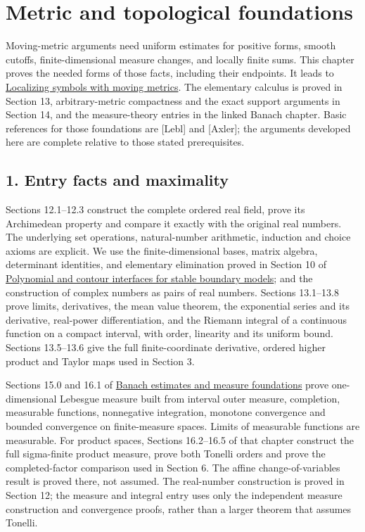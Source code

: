 \documentclass[
  11pt,
]{article}
\author{}
\date{}
\begin{document}
\section{Metric and topological
foundations}\label{metric-and-topological-foundations}

Moving-metric arguments need uniform estimates for positive forms,
smooth cutoffs, finite-dimensional measure changes, and locally finite
sums. This chapter proves the needed forms of those facts, including
their endpoints. It leads to \href{metric-localization.pdf}{Localizing
symbols with moving metrics}. The elementary calculus is proved in
Section 13, arbitrary-metric compactness and the exact support arguments
in Section 14, and the measure-theory entries in the linked Banach
chapter. Basic references for those foundations are {[}Lebl{]} and
{[}Axler{]}; the arguments developed here are complete relative to those
stated prerequisites.

\subsection{1. Entry facts and
maximality}\label{entry-facts-and-maximality}

Sections 12.1--12.3 construct the complete ordered real field, prove its
Archimedean property and compare it exactly with the original real
numbers. The underlying set operations, natural-number arithmetic,
induction and choice axioms are explicit. We use the finite-dimensional
bases, matrix algebra, determinant identities, and elementary
elimination proved in Section 10 of
\href{stable-prerequisite-bridges.md\#full-finite-linear-algebra-foundations}{Polynomial
and contour interfaces for stable boundary models}; and the construction
of complex numbers as pairs of real numbers. Sections 13.1--13.8 prove
limits, derivatives, the mean value theorem, the exponential series and
its derivative, real-power differentiation, and the Riemann integral of
a continuous function on a compact interval, with order, linearity and
its uniform bound. Sections 13.5--13.6 give the full finite-coordinate
derivative, ordered higher product and Taylor maps used in Section 3.

Sections 15.0 and 16.1 of \href{banach-foundation-bridges.pdf}{Banach
estimates and measure foundations} prove one-dimensional Lebesgue
measure built from interval outer measure, completion, measurable
functions, nonnegative integration, monotone convergence and bounded
convergence on finite-measure spaces. Limits of measurable functions are
measurable. For product spaces, Sections 16.2--16.5 of that chapter
construct the full sigma-finite product measure, prove both Tonelli
orders and prove the completed-factor comparison used in Section 6. The
affine change-of-variables result is proved there, not assumed. The
real-number construction is proved in Section 12; the measure and
integral entry uses only the independent measure construction and
convergence proofs, rather than a larger theorem that assumes Tonelli.
\end{document}

